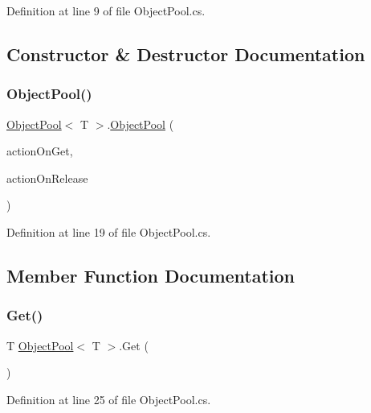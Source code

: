 Definition at line 9 of file Object\+Pool.\+cs.



\subsection{Constructor \& Destructor Documentation}
\mbox{\label{class_object_pool_ac7f7c5e592e12b2b9d7ed59ec64a2d6d}} 
\subsubsection{\texorpdfstring{Object\+Pool()}{ObjectPool()}}
{\footnotesize\ttfamily \mbox{\hyperlink{class_object_pool}{Object\+Pool}}$<$ T $>$.\mbox{\hyperlink{class_object_pool}{Object\+Pool}} (\begin{DoxyParamCaption}\item[{Unity\+Action$<$ T $>$}]{action\+On\+Get,  }\item[{Unity\+Action$<$ T $>$}]{action\+On\+Release }\end{DoxyParamCaption})}



Definition at line 19 of file Object\+Pool.\+cs.



\subsection{Member Function Documentation}
\mbox{\label{class_object_pool_a28b7e503afcecfb7f8ae7647c7efdff8}} 
\subsubsection{\texorpdfstring{Get()}{Get()}}
{\footnotesize\ttfamily T \mbox{\hyperlink{class_object_pool}{Object\+Pool}}$<$ T $>$.Get (\begin{DoxyParamCaption}{ }\end{DoxyParamCaption})}



Definition at line 25 of file Object\+Pool.\+cs.

\mbox{\label{class_object_pool_af85041dbe64efa883573f2ad8e24f852}} 
